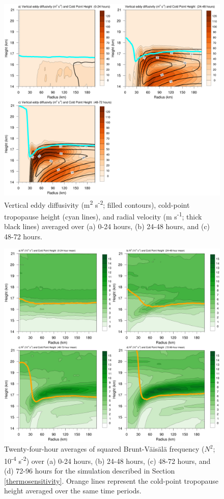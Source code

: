 \begin{figure}[ht]
\centerline{\includegraphics[width=39pc]{figures/khvten.png}}
\caption{Vertical eddy diffusivity (m\textsuperscript{2} s\textsuperscript{-2}; filled contours), cold-point tropopause height (cyan lines), and radial velocity (m s\textsuperscript{-1}; thick black lines) averaged over (a) 0-24 hours, (b) 24-48 hours, and (c) 48-72 hours.}
\label{fig:diff}
\end{figure}

\begin{figure}[ht]
\centerline{\includegraphics[width=39pc]{figures/n2-1000km.png}}
\caption{Twenty-four-hour averages of squared Brunt-V{\"a}is{\"a}l{\"a} frequency ($N^2$; 10\textsuperscript{-4} s\textsuperscript{-2}) over (a) 0-24 hours, (b) 24-48 hours, (c) 48-72 hours, and (d) 72-96 hours for the simulation described in Section \ref{thermosensitivity}. Orange lines represent the cold-point tropopause height averaged over the same time periods.}
\label{fig:n2-1000km}
\end{figure}

